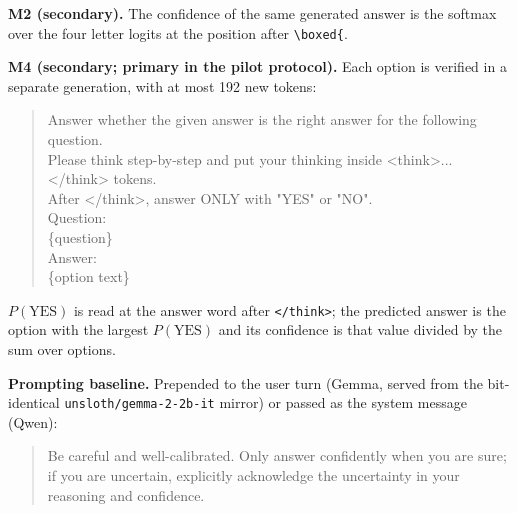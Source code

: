 \documentclass{article}
\begin{document}
\textbf{M2 (secondary).} The confidence of the same generated answer is the
softmax over the four letter logits at the position after
\texttt{\textbackslash boxed\{}.

\textbf{M4 (secondary; primary in the pilot protocol).} Each option is
verified in a separate generation, with at most 192 new tokens:
\begin{quote}\footnotesize\ttfamily
Answer whether the given answer is the right answer for the following question.\\
Please think step-by-step and put your thinking inside <think>...</think> tokens.\\
After </think>, answer ONLY with "YES" or "NO".\\[3pt]
Question:\\
\{question\}\\
Answer:\\
\{option text\}
\end{quote}
$P(\mathrm{YES})$ is read at the answer word after \texttt{</think>}; the
predicted answer is the option with the largest $P(\mathrm{YES})$ and its
confidence is that value divided by the sum over options.

\textbf{Prompting baseline.} Prepended to the user turn (Gemma, served from the
bit-identical \texttt{unsloth/gemma-2-2b-it} mirror) or passed as the system
message (Qwen):
\begin{quote}\footnotesize\ttfamily
Be careful and well-calibrated. Only answer confidently when you are sure; if you are uncertain, explicitly acknowledge the uncertainty in your reasoning and confidence.
\end{quote}
\end{document}
